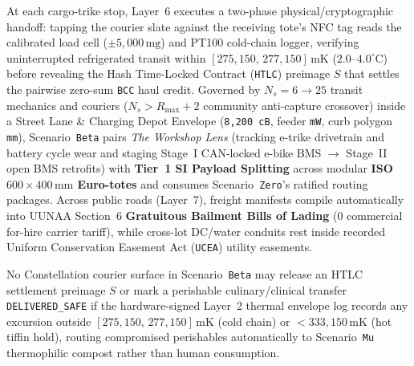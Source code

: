 At each cargo-trike stop, Layer~6 executes a two-phase physical/cryptographic handoff: tapping the courier slate against the receiving tote's NFC tag reads the calibrated load cell ($\pm 5{,}000\,\mathrm{mg}$) and PT100 cold-chain logger, verifying uninterrupted refrigerated transit within $[275{,}150,\, 277{,}150]\,\mathrm{mK}$ ($2.0\text{--}4.0^\circ\mathrm{C}$) before revealing the Hash Time-Locked Contract (\texttt{HTLC}) preimage $S$ that settles the pairwise zero-sum \texttt{BCC} haul credit. Governed by $N_s = 6 \to 25$ transit mechanics and couriers ($N_s > R_{\max}+2$ community anti-capture crossover) inside a Street Lane \& Charging Depot Envelope (\texttt{8,200 cB}, feeder \texttt{mW}, curb polygon \texttt{mm}), Scenario~\texttt{Beta} pairs \textit{The Workshop Lens} (tracking e-trike drivetrain and battery cycle wear and staging Stage~I CAN-locked e-bike BMS $\to$ Stage~II open BMS retrofits) with \textbf{Tier~1 SI Payload Splitting} across modular \textbf{ISO $600 \times 400\,\mathrm{mm}$ Euro-totes} and consumes Scenario~\texttt{Zero}'s ratified routing packages. Across public roads (Layer~7), freight manifests compile automatically into UUNAA Section~6 \textbf{Gratuitous Bailment Bills of Lading} ($0$ commercial for-hire carrier tariff), while cross-lot DC/water conduits rest inside recorded Uniform Conservation Easement Act (\texttt{UCEA}) utility easements.

\begin{invariant}
\label{inv:wave-b-custody}
No Constellation courier surface in Scenario~\texttt{Beta} may release an HTLC settlement preimage $S$ or mark a perishable culinary/clinical transfer \texttt{DELIVERED\_SAFE} if the hardware-signed Layer~2 thermal envelope log records any excursion outside $[275{,}150,\, 277{,}150]\,\mathrm{mK}$ (cold chain) or $< 333{,}150\,\mathrm{mK}$ (hot tiffin hold), routing compromised perishables automatically to Scenario~\texttt{Mu} thermophilic compost rather than human consumption.
\end{invariant}

